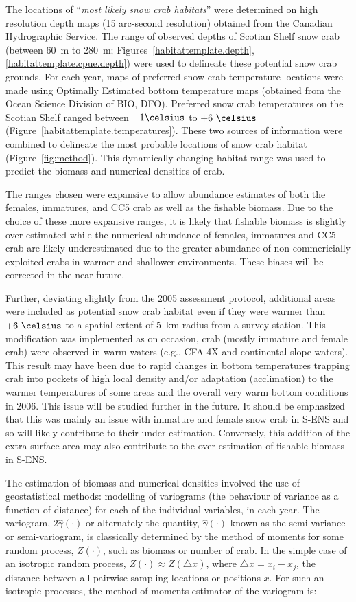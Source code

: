 \documentclass[11pt]{article}
\begin{document}
The locations of ``\textit{most likely snow crab habitats}'' were determined on high resolution depth maps (15 arc-second resolution) obtained from the Canadian Hydrographic Service. The range of observed depths of Scotian Shelf snow crab (between 60~m to 280~m; Figures~\ref{habitattemplate.depth}, \ref{habitattemplate.cpue.depth}) were used to delineate these potential snow crab grounds. For each year, maps of preferred snow crab temperature locations were made using Optimally Estimated bottom temperature maps (obtained from the Ocean Science Division of BIO, DFO). Preferred snow crab temperatures on the Scotian Shelf ranged between $-1 \celsius$ {} to $+6 ~\celsius$ {} (Figure~\ref{habitattemplate.temperatures}). These two sources of information were combined to delineate the most probable locations of snow crab habitat (Figure~\ref{fig:method}). This dynamically changing habitat range was used to predict the biomass and numerical densities of crab. 

The ranges chosen were expansive to allow abundance estimates of both the females, immatures, and CC5 crab as well as the fishable biomass. Due to the choice of these more expansive ranges, it is likely that fishable biomass is slightly over-estimated while the numerical abundance of females, immatures and CC5 crab are likely underestimated due to the greater abundance of non-commericially exploited crabs in warmer and shallower environments.  These biases will be corrected in the near future. 

Further, deviating slightly from the 2005 assessment protocol, additional areas were included as potential snow crab habitat even if they were warmer than $+6 ~\celsius$ {} to a spatial extent of 5~km radius from a survey station. This modification was implemented as on occasion, crab (mostly immature and female crab) were observed in warm waters (e.g., CFA 4X and continental slope waters). This result may have been due to rapid changes in bottom temperatures trapping crab into pockets of high local density and/or adaptation (acclimation) to the warmer temperatures of some areas and the overall very warm bottom conditions in 2006. This issue will be studied further in the future. It should be emphasized that this was mainly an issue with immature and female snow crab in S-ENS and so will likely contribute to their under-estimation. Conversely, this addition of the extra surface area may also contribute to the over-estimation of fishable biomass in S-ENS.

The estimation of biomass and numerical densities involved the use of geostatistical methods: modelling of variograms (the behaviour of variance as a function of distance) for each of the individual variables, in each year. The variogram, $2 \hat{ \gamma}(\cdot) $ or alternately the quantity, $\hat{ \gamma} (\cdot)$ known as the semi-variance or semi-variogram, is classically determined by the method of moments \citep{Cressie1993} for some random process, $Z(\cdot)$, such as biomass or number of crab. In the simple case of an isotropic random process, $Z(\cdot)  \approx Z( \bigtriangleup x )$, where $\bigtriangleup x = x_i - x_j$, the distance between all pairwise sampling locations or positions $x$. For such an isotropic processes, the method of moments estimator of the variogram is:
\end{document}
